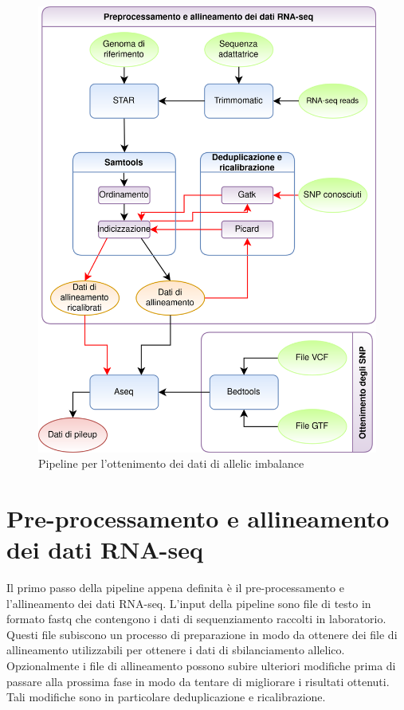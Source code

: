   \begin{figure}[H]
    \centering
    \includegraphics[scale=0.2]{pipeline.png}
    \caption{Pipeline per l'ottenimento dei dati di allelic imbalance}
    \label{fig:proj_pipeline}
  \end{figure}

  \section{Pre-processamento e allineamento dei dati RNA-seq}
  \label{sec:pre_all_rna_seq}
  Il primo passo della pipeline appena definita \`e il pre-processamento e l'allineamento dei dati RNA-seq.
  L'input della pipeline sono file di testo in formato fastq che contengono i dati di sequenziamento raccolti in laboratorio.
  Questi file subiscono un processo di preparazione in modo da ottenere dei file di allineamento utilizzabili per ottenere i dati di sbilanciamento allelico.
  Opzionalmente i file di allineamento possono subire ulteriori modifiche prima di passare alla prossima fase in modo da tentare di migliorare i risultati ottenuti.
  Tali modifiche sono in particolare deduplicazione e ricalibrazione.

